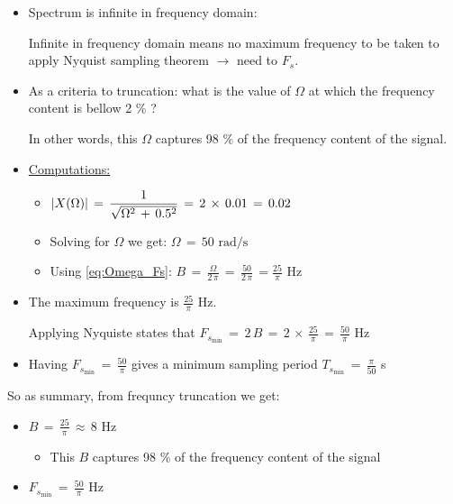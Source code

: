 \begin{itemize}
    
\item Spectrum is infinite in frequency domain:    
    
Infinite in frequency domain means no maximum frequency to be taken to apply Nyquist sampling theorem $\rightarrow$ need to  $F_s$.\\

\item As a criteria to truncation: what is the value of $\Omega$ at which the frequency content is bellow 2 \% ? 

In other words, this $\Omega$ captures 98 \% of the frequency content of the signal.

\item \underline{Computations:} 

\begin{itemize}

\item $ \displaystyle\left\lvert X(\Omega) \displaystyle\right\rvert \, = \, \displaystyle\frac{1}{\sqrt{ \Omega^2\, + \, 0.5^2} } \, = \, 2 \, \times \, 0.01 \, = \, 0.02 $ 

\item Solving for $\Omega$ we get: $\Omega \, = \, 50 \text{ rad/s}$

\item Using \autoref{eq:Omega_Fs}: $B \, = \, \displaystyle\frac{\Omega}{2 \, \pi} \, = \, \displaystyle\frac{50}{2 \, \pi} \, = \displaystyle\frac{25}{\pi}$ Hz

\end{itemize}

\item The maximum frequency is $\displaystyle\frac{25}{\pi}$ Hz.

Applying Nyquiste states that $F_{s_{\text{min}}} \, = \, 2 \, B \, = \, 2 \, \times \, \displaystyle\frac{25}{\pi} \, = \, \displaystyle\frac{50}{\pi}$ Hz

\item Having $F_{s_{\text{min}}} \, = \, \displaystyle\frac{50}{\pi}$ gives a minimum sampling period $T_{s_{\text{min}}} \, = \, \displaystyle\frac{\pi}{50} $ s

\end{itemize}

So as summary, from frequncy truncation we get:

\begin{itemize}

\item $B \, = \, \displaystyle\frac{25}{\pi} \, \approx \, 8$ Hz

	\begin{itemize}
	\item This $B$ captures 98 \% of the frequency content of the signal
	\end{itemize}

\item $F_{s_{\text{min}}} \, = \, \displaystyle\frac{50}{\pi}$ Hz

\end{itemize}
  

